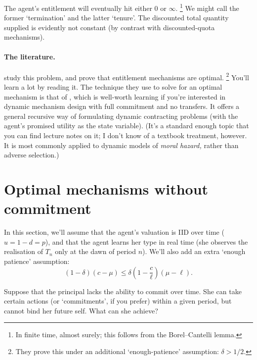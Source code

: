 The agent's entitlement will eventually hit either $0$ or $\infty$.%
	\footnote{In finite time, almost surely; this follows from the Borel--Cantelli lemma.}
We might call the former `termination'
and the latter `tenure'.
The discounted total quantity supplied is evidently not constant (by contrast with discounted-quota mechanisms).


\paragraph{The literature.}
\textcite{GuoHorner2020} study this problem, and prove that entitlement mechanisms are optimal.%
	\footnote{They prove this under an additional `enough-patience' assumption: $\delta > 1/2$.}
You'll learn a lot by reading it.
The technique they use to solve for an optimal mechanism is that of \textcite{SpearSrivastava1987}, which is well-worth learning if you're interested in dynamic mechanism design with full commitment and no transfers.
It offers a general recursive way of formulating dynamic contracting problems (with the agent's promised utility as the state variable).
(It's a standard enough topic that you can find lecture notes on it; I don't know of a textbook treatment, however. It is most commonly applied to dynamic models of \emph{moral hazard,} rather than adverse selection.)



\section{Optimal mechanisms without commitment}
\label{sec:ch3:nocommitment}

In this section, we'll assume that the agent's valuation is IID over time ($u = 1-d = p$),
and that the agent learns her type in real time (she observes the realisation of $T_n$ only at the dawn of period $n$).
We'll also add an extra `enough patience' assumption:
%
\begin{equation*}
	(1-\delta) (c-\mu)
	\leq \delta \left( 1 - \frac{c}{\ell} \right) \left( \mu - \ell \right) .
\end{equation*}

Suppose that the principal lacks the ability to commit over time.
She can take certain actions (or `commitments', if you prefer) within a given period, but cannot bind her future self.
What can she achieve?

